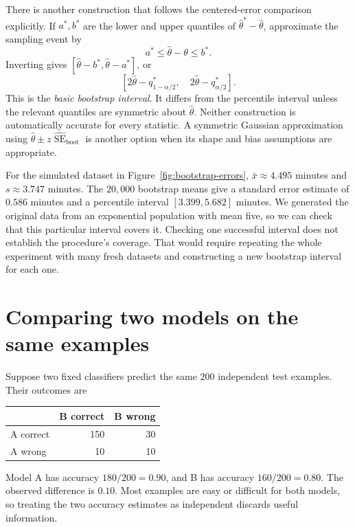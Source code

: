 There is another construction that follows the centered-error
comparison explicitly. If \(a^*,b^*\) are the lower and upper
quantiles of \(\widehat\theta^*-\widehat\theta\), approximate the
sampling event by
\[
  a^*\le\widehat\theta-\theta\le b^*.
\]
Inverting gives \([\widehat\theta-b^*,\widehat\theta-a^*]\), or
\[
  [2\widehat\theta-q_{1-\alpha/2}^*,\quad
   2\widehat\theta-q_{\alpha/2}^*].
\]
This is the \emph{basic bootstrap interval}. It differs from the
percentile interval unless the relevant quantiles are symmetric
about \(\widehat\theta\). Neither construction is automatically
accurate for every statistic. A symmetric Gaussian approximation
using \(\widehat\theta\pm z\widehat{\operatorname{SE}}_{\mathrm{boot}}\)
is another option when its shape and bias assumptions are appropriate.

For the simulated dataset in Figure~\ref{fig:bootstrap-errors},
\(\bar x\approx4.495\) minutes and \(s\approx3.747\) minutes.
The \(20{,}000\) bootstrap means give a standard error estimate
of \(0.586\) minutes and a percentile interval
\([3.399,5.682]\) minutes. We generated the original data from an
exponential population with mean five, so we can check that this
particular interval covers it. Checking one successful interval does
not establish the procedure's coverage. That would require repeating
the whole experiment with many fresh datasets and constructing a new
bootstrap interval for each one.

\section{Comparing two models on the same examples}
\label{sec:paired-bootstrap}

Suppose two fixed classifiers predict the same \(200\) independent
test examples. Their outcomes are
\begin{center}
\begin{tabular}{@{}lrr@{}}
\toprule
 & B correct & B wrong\\
\midrule
A correct & 150 & 30\\
A wrong   & 10  & 10\\
\bottomrule
\end{tabular}
\end{center}
Model A has accuracy \(180/200=0.90\), and B has accuracy
\(160/200=0.80\). The observed difference is \(0.10\).
Most examples are easy or difficult for both models, so treating the
two accuracy estimates as independent discards useful information.

